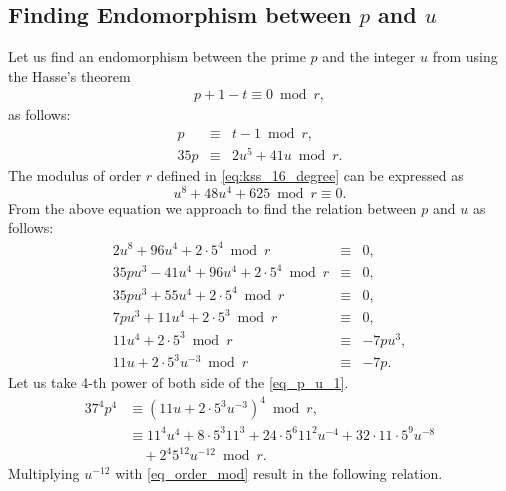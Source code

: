 \subsection{Finding  Endomorphism between $p$ and $u$}
Let us find an endomorphism between the prime $p$ and the integer $u$ from using the Hasse's theorem
\begin{eqnarray}
p+1 - t \equiv 0 \bmod r, \nonumber
\end{eqnarray}
as follows:
\begin{eqnarray}
p & \equiv & t-1 \bmod r, \nonumber \\
35p   & \equiv &  2u^5+41u \bmod r. \label{eq_pt1}
\end{eqnarray}
The modulus of order $r$ defined in \eqref{eq:kss_16_degree} can be expressed as 
\begin{equation}
u^8+48u^4+625 \bmod r \equiv  0 .\label{eq_order_mod}
\end{equation}
From the above equation we approach to find the relation between $p$ and $u$ as follows:
\begin{eqnarray}
2u^8+ 96u^4 + 2 \cdot 5^4\bmod r & \equiv & 0, \nonumber \\
35pu^3-41u^4 + 96u^4 + 2 \cdot 5^4 \bmod r & \equiv & 0,\nonumber \\
35pu^3+55u^4+2\cdot5^4 \bmod r & \equiv & 0, \nonumber \\
7pu^3+11u^4+2\cdot5^3 \bmod r & \equiv & 0, \nonumber \\
11u^4+2\cdot5^3 \bmod r & \equiv & -7pu^3, \nonumber \\
11u+2\cdot5^3u^{-3} \bmod r & \equiv & -7p. \label{eq_p_u_1}
\end{eqnarray}
Let us take 4-th power of both side of the \eqref{eq_p_u_1}.
\begin{alignat}{3}
7^4p^4 &  \equiv (11u+2\cdot5^3u^{-3})^4 \bmod r, \nonumber \\
 & \equiv  11^4u^4 + 8 \cdot 5^3 11^3 + 24\cdot  5^6 11^2 u^{-4} + 32 \cdot 11 \cdot 5^9u^{-8} \nonumber \\
 &  \quad  + 2^4 5^{12}u^{-12} \bmod r. \label{eq_74p4}
\end{alignat}
Multiplying $u^{-12}$ with \eqref{eq_order_mod} result in the following relation.
